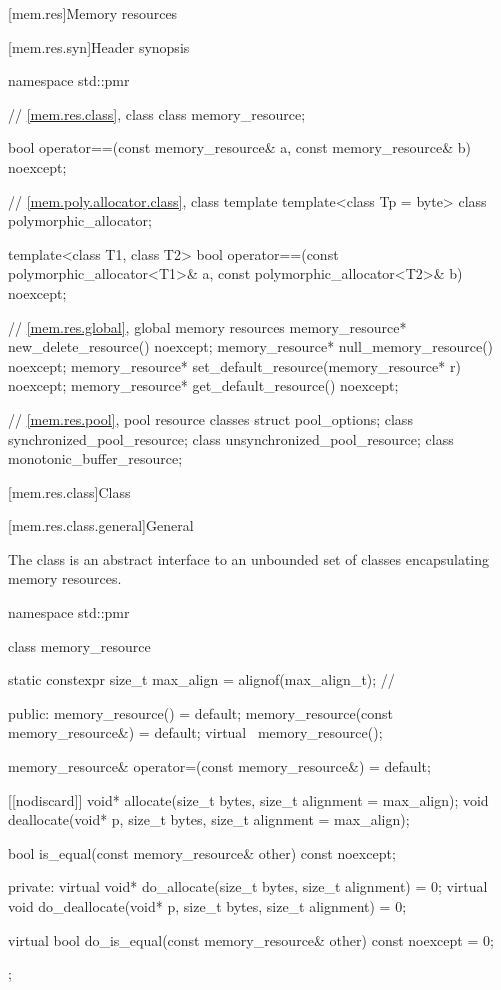 [mem.res]{Memory resources}

[mem.res.syn]{Header  synopsis}

%
\begin{codeblock}
namespace std::pmr {
  // \ref{mem.res.class}, class 
  class memory_resource;

  bool operator==(const memory_resource& a, const memory_resource& b) noexcept;

  // \ref{mem.poly.allocator.class}, class template 
  template<class Tp = byte> class polymorphic_allocator;

  template<class T1, class T2>
    bool operator==(const polymorphic_allocator<T1>& a,
                    const polymorphic_allocator<T2>& b) noexcept;

  // \ref{mem.res.global}, global memory resources
  memory_resource* new_delete_resource() noexcept;
  memory_resource* null_memory_resource() noexcept;
  memory_resource* set_default_resource(memory_resource* r) noexcept;
  memory_resource* get_default_resource() noexcept;

  // \ref{mem.res.pool}, pool resource classes
  struct pool_options;
  class synchronized_pool_resource;
  class unsynchronized_pool_resource;
  class monotonic_buffer_resource;
}
\end{codeblock}

[mem.res.class]{Class }

[mem.res.class.general]{General}

\pnum
The  class is an abstract interface to an unbounded set of classes encapsulating memory resources.

%
%
\begin{codeblock}
namespace std::pmr {
  class memory_resource {
    static constexpr size_t max_align = alignof(max_align_t);   // \expos

  public:
    memory_resource() = default;
    memory_resource(const memory_resource&) = default;
    virtual ~memory_resource();

    memory_resource& operator=(const memory_resource&) = default;

    [[nodiscard]] void* allocate(size_t bytes, size_t alignment = max_align);
    void deallocate(void* p, size_t bytes, size_t alignment = max_align);

    bool is_equal(const memory_resource& other) const noexcept;

  private:
    virtual void* do_allocate(size_t bytes, size_t alignment) = 0;
    virtual void do_deallocate(void* p, size_t bytes, size_t alignment) = 0;

    virtual bool do_is_equal(const memory_resource& other) const noexcept = 0;
  };
}
\end{codeblock}


